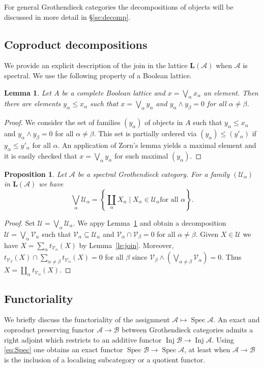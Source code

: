 \documentclass[a4paper]{amsart}
\theoremstyle{plain}
\newtheorem{prop}[thm]{Proposition}
\newtheorem{lem}[thm]{Lemma}
\theoremstyle{definition}
\theoremstyle{remark}
\numberwithin{equation}{section}
\newcommand{\Inj}{\operatorname{Inj}}
\newcommand{\Spec}{\operatorname{Spec}}
\def\A{\mathcal A}
\def\B{\mathcal B}
\def\U{\mathcal U}
\def\V{\mathcal V}
\def\bfL{\mathbf L}
\def\a{\alpha}
\def\b{\beta}
\begin{document}
For general Grothendieck categories the decompositions of objects will
be discussed in more detail in \S\ref{se:decomp}.


\subsection*{Coproduct decompositions}

We provide an explicit description of the join in the lattice
$\bfL(\A)$ when $\A$ is spectral. We use the following property of a
Boolean lattice.

\begin{lem}\label{le:BA-decomp}
  Let $A$ be a complete Boolean lattice and $x=\bigvee_\a x_\a$ an
  element. Then there are elements $y_\a\le x_\a$ such that
  $x=\bigvee_\a y_\a$ and $y_\a\wedge y_\b=0$ for all $\a\neq\b$.
\end{lem}
\begin{proof}
  We consider the set of families $(y_\a)$ of objects in $A$ such that  $y_\a\le x_\a$ and
  $y_\a\wedge y_\b=0$ for all $\a\neq\b$. This set is partially ordered
  via $(y_\a)\le (y'_\a)$ if $y_\a\le y'_\a$ for all $\a$. An
  application of Zorn's lemma yields a maximal element and it is
  easily checked that  $x=\bigvee_\a y_\a$ for such maximal  $(y_\a)$.
\end{proof}


\begin{prop}\label{pr:spec-join}
  Let $\A$ be a spectral Grothendieck category. For a family $(\U_\a)$ in
  $\bfL(\A)$ we have
  \[\bigvee_\a\U_\a=\left\{\coprod_\a X_\a\mid X_\a\in\U_\a\text{
    for all }\a\right\}.\]
\end{prop}
\begin{proof}
  Set $\U=\bigvee_\a\U_\a$. We appy Lemma~\ref{le:BA-decomp} and
  obtain a decomposition $\U=\bigvee_\a\V_\a$ such that
  $\V_\a\subseteq\U_\a$ and $\V_\a\cap\V_\b=0$ for all
  $\a\neq\b$. Given $X\in\U$ we have $X=\sum_\a t_{\V_\a}(X)$ by
  Lemma~\ref{le:join}. Moreover,  $t_{\V_\b}(X)\cap\sum_{\a\neq \b}
  t_{\V_\a}(X)=0$ for all $\b$ since $\V_\b\wedge\left(\bigvee_{\a\neq\b}\V_\a\right)=0$.
Thus   $X=\coprod_\a t_{\V_\a}(X)$.
\end{proof}


\subsection*{Functoriality}

We  briefly discuss the functoriality of the assignment
$\A\mapsto\Spec\A$.  An exact and coproduct preserving functor
$\A\to \B$ between Grothendieck categories admits a right adjoint
which restricts to an additive functor $\Inj\B\to\Inj\A$.  Using
\eqref{eq:Spec} one obtains an exact functor $\Spec\B\to\Spec\A$, at
least when $\A\to \B$ is the inclusion of a localising subcategory or
a quotient functor.
\end{document}
